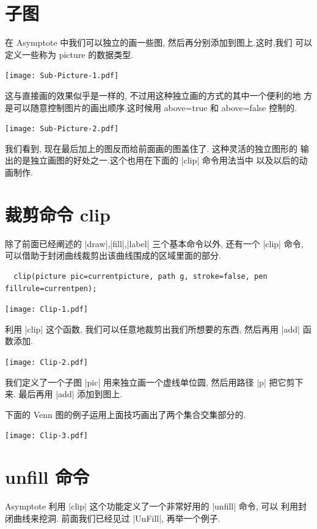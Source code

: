 \documentclass{ctexbook}
\begin{document}
\section{子图}
在 Asymptote 中我们可以独立的画一些图, 然后再分别添加到图上.这时,我们
可以定义一些称为 {picture} 的数据类型.
\begin{center}\texttt{[image: Sub-Picture-1.pdf]}\end{center}%


这与直接画的效果似乎是一样的, 不过用这种独立画的方式的其中一个便利的地
方是可以随意控制图片的画出顺序.这时候用 {above=true} 和 {above=false}
控制的.
\begin{center}\texttt{[image: Sub-Picture-2.pdf]}\end{center}%


我们看到, 现在最后加上的图反而给前面画的图盖住了. 这种灵活的独立图形的
输出的是独立画图的好处之一.这个也用在下面的 |clip| 命令用法当中
以及以后的动画制作.

\section{裁剪命令 clip}
除了前面已经阐述的 |draw|,|fill|,|label| 三个基本命令以外, 还有一个
|clip| 命令, 可以借助于封闭曲线裁剪出该曲线围成的区域里面的部分.
\begin{lstlisting}
  clip(picture pic=currentpicture, path g, stroke=false, pen fillrule=currentpen);
\end{lstlisting}

\begin{center}\texttt{[image: Clip-1.pdf]}\end{center}%


利用 |clip| 这个函数, 我们可以任意地裁剪出我们所想要的东西, 然后再用
|add| 函数添加.
\begin{center}\texttt{[image: Clip-2.pdf]}\end{center}%


我们定义了一个子图 |pic| 用来独立画一个虚线单位圆, 然后用路径
|p| 把它剪下来. 最后再用 |add| 添加到图上.

下面的 Venn 图的例子运用上面技巧画出了两个集合交集部分的.
\begin{center}\texttt{[image: Clip-3.pdf]}\end{center}%


\section{unfill 命令}
Asymptote 利用 |clip| 这个功能定义了一个非常好用的 |unfill| 命令, 可以
利用封闭曲线来挖洞. 前面我们已经见过 |UnFill|, 再举一个例子.
\end{document}
